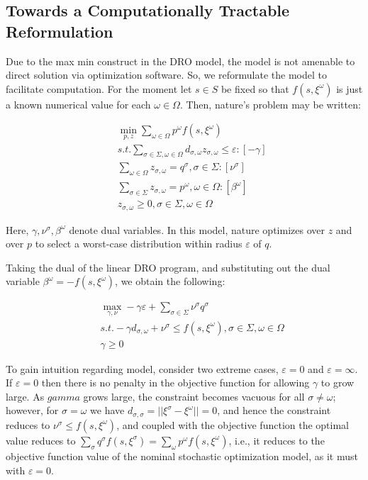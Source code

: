 \subsection{Towards a Computationally Tractable Reformulation}
\label{TractableReformulation}
Due to the max min construct in the DRO model, the model is not amenable to direct solution
via optimization software. So, we reformulate the model to facilitate computation.
For the moment let $s\in S$ be fixed so that $f(s, \xi^\omega)$ is just a known numerical
value for each $\omega \in \Omega$. Then, nature’s problem may be written:

\begin{subequations}
\begin{eqnarray}
& & \min_{p, z} \sum_{\omega \in \Omega} p^\omega f(s, \xi^\omega) \\
& & s.t. \sum_{\sigma \in \Sigma, \omega \in \Omega} d_{\sigma, \omega} z_{\sigma, \omega} \le \varepsilon : [-\gamma] \\
& & \sum_{\omega \in \Omega} z_{\sigma, \omega} = q^\sigma, \sigma \in \Sigma : [\nu^\sigma]\\
& & \sum_{\sigma \in \Sigma} z_{\sigma, \omega} = p^\omega, \omega \in \Omega : [\beta^\omega]\\
& & z_{\sigma, \omega} \ge 0, \sigma \in \Sigma, \omega \in \Omega
\end{eqnarray}
\end{subequations}

Here, $\gamma, \nu^\sigma, \beta^\omega$ denote dual variables.
In this model, nature optimizes over $z$ and over $p$ to select a worst-case distribution
within radius $\varepsilon$ of $q$.

Taking the dual of the linear DRO program, and substituting out the dual variable
$\beta^\omega= -f(s, \xi^\omega)$, we obtain the following:

\begin{subequations}\label{dualProlem}
\begin{eqnarray}
& & \max_{\gamma, \nu} -\gamma \varepsilon + \sum_{\sigma\in \Sigma} \nu^\sigma q^\sigma \\
& & s.t. -\gamma d_{\sigma, \omega} + \nu^\sigma \le f(s, \xi^\omega), \sigma \in \Sigma, \omega \in \Omega \\
& & \gamma \ge 0
\end{eqnarray}
\end{subequations}

To gain intuition regarding model, consider two extreme cases, $\varepsilon = 0$ and $\varepsilon = \infty$.
If $\varepsilon = 0$ then there is no penalty in the objective function for allowing $\gamma$
to grow large. As $gamma$ grows large, the constraint becomes vacuous for all $\sigma \ne \omega$;
however, for $\sigma = \omega$ we have $d_{\sigma, \sigma} = ||\xi^\sigma - \xi^\omega|| = 0$,
and hence the constraint reduces to $\nu^\sigma \le f(s, \xi^\omega)$, and coupled with the objective
function the optimal value reduces to $\sum_\sigma q^\sigma f(s, \xi^\sigma) = \sum_\omega p^\omega f(s, \xi^\omega)$,
i.e., it reduces to the objective function value of the nominal stochastic optimization model,
as it must with $\varepsilon = 0$.

